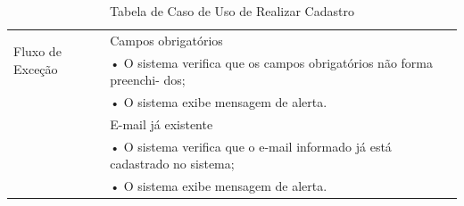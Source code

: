\documentclass[a4paper,12pt]{article}
\begin{document}
\begin{table}[ht]
\begin{tabular}{|p{3.5cm}|p{10cm}|p{7cm}|}
        \multirow{2}{*}{Fluxo de Exceção}
                                           & Campos obrigatórios                                                                      \\
                                           & • O sistema verifica que os campos obrigatórios não forma preenchi-
        dos;                                                                                                                          \\
                                           & • O sistema exibe mensagem de alerta.                                                    \\
                                           & E-mail já existente                                                                      \\
                                           & • O sistema verifica que o e-mail informado já está cadastrado no
        sistema;                                                                                                                      \\
                                           & • O sistema exibe mensagem de alerta.                                                    \\
        \hline
    \end{tabular}
    \caption{Tabela de Caso de Uso de Realizar Cadastro}
\end{table}
\end{document}
